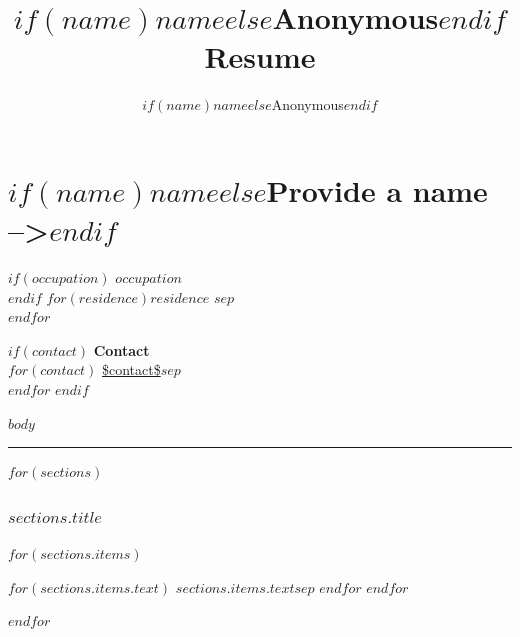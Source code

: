 \documentclass[11pt,a4paper]{scrartcl}
\author{$if(name)$$name$$else$Anonymous$endif$}
\title{$if(name)$$name$$else$Anonymous$endif$ Resume}
\begin{document}
\color{TxtColor}

\part*{$if(name)$$name$$else$Provide a name -->$endif$}

\begin{minipage}[t]{0.48\textwidth}
$if(occupation)$
\textbf{$occupation$} \\
$endif$
$for(residence)$$residence$ $sep$ \\$endfor$
\end{minipage}%
\begin{minipage}[t]{0.48\textwidth}
\begin{flushright}
$if(contact)$
  \textbf{Contact} \\
    $for(contact)$
    \url{$contact$}$sep$ \\
    $endfor$
$endif$
\end{flushright}
\end{minipage}

$body$

{\color{AccentColor}\rule{\linewidth}{0.5mm}}

$for(sections)$
\section*{$sections.title$}
\begin{description}

$for(sections.items)$
\item [ $if(sections.items.label)$$sections.items.label$$endif$ ]
  $for(sections.items.text)$
    $sections.items.text$$sep$ \newline
  $endfor$
$endfor$

\end{description}
$endfor$
\end{document}
